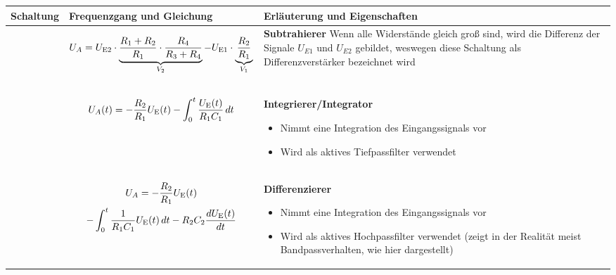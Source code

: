 \begin{table}[ht]
    \begin{tabular}{|m{}|m{}|m{}|}
     \hline 
    Schaltung & Frequenzgang und Gleichung & Erläuterung und Eigenschaften \\ %
    \hline
    
      &
      \begin{center}
      
 \end{center}
 \vspace{1ex}
 \[
 \begin{aligned}
    {U_A} = {U_{{\textnormal{E2}}}} \cdot \underbrace{ \frac{R_1 + R_2}{R_1} \cdot \frac{R_4}{R_3 + R_4}}_{V_2} - U_{\textnormal{E1}} \cdot \underbrace{\frac{R_2}{R_1}}_{V_1}
\end{aligned}
 \]
     &
     \textbf{Subtrahierer}\newline
     Wenn alle Widerstände gleich groß sind, wird die Differenz der Signale $U_{E1}$ und $U_{E2}$ gebildet, weswegen diese Schaltung als Differenzverstärker bezeichnet wird
 \\ %
     \hline

    
     & 
     \begin{center}
    
     \[
     U_A(t) = - \frac{R_2}{R_1} U_{\textnormal{E}}(t) - \int_0^t \frac{U_{\textnormal{E}}(t)}{R_1 C_1} \, dt
     \]
     \end{center} 
     &
    \textbf{Integrierer/Integrator}\newline
    \begin{itemize}
        \item Nimmt eine Integration des Eingangssignals vor
        \item Wird als aktives Tiefpassfilter verwendet
    \end{itemize}
      \\ 
      \hline
    
    &
    \begin{center}
    
    \begin{multline*}
        U_A = - \frac{R_2}{R_1} U_{\textnormal{E}}(t) \\
        - \int_0^t \frac{1}{R_1 C_1} U_{\textnormal{E}}(t) \, dt 
        - R_2 C_2\frac{dU_{\textnormal{E}}(t)}{dt}
    \end{multline*}
    \end{center} 
    & 
    \textbf{Differenzierer}\newline
    \begin{itemize}
        \item Nimmt eine Integration des Eingangssignals vor
        \item Wird als aktives Hochpassfilter verwendet (zeigt in der Realität meist Bandpassverhalten, wie hier dargestellt)
    \end{itemize}
    \\
    \hline
\end{tabular}
\end{table}






